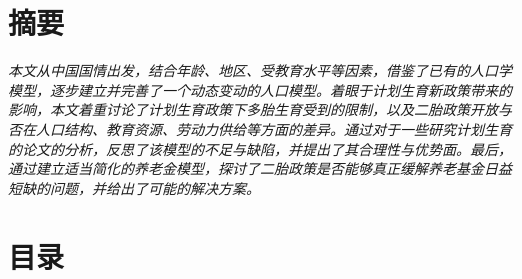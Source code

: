 \documentclass[a4paper]{article}
\begin{document}


\part*{摘要}
\textit{本文从中国国情出发，结合年龄、地区、受教育水平等因素，借鉴了已有的人口学模型，逐步建立并完善了一个动态变动的人口模型。着眼于计划生育新政策带来的影响，本文着重讨论了计划生育政策下多胎生育受到的限制，以及二胎政策开放与否在人口结构、教育资源、劳动力供给等方面的差异。通过对于一些研究计划生育的论文的分析，反思了该模型的不足与缺陷，并提出了其合理性与优势面。最后，通过建立适当简化的养老金模型，探讨了二胎政策是否能够真正缓解养老基金日益短缺的问题，并给出了可能的解决方案。}

\part{目录}
\tableofcontents
\end{document}
